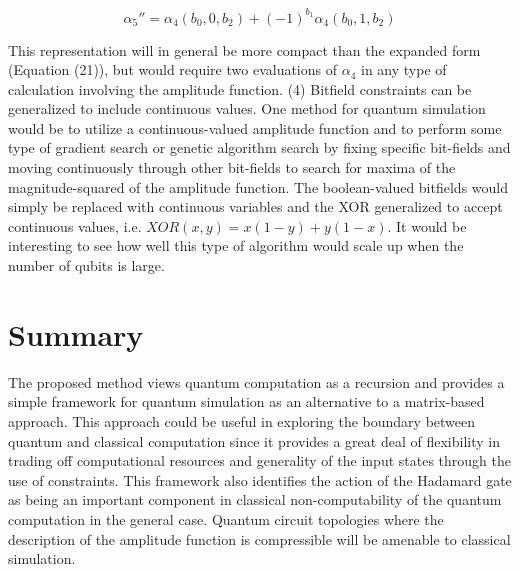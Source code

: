 \documentclass[reqno]{amsart}
\theoremstyle{definition}
\theoremstyle{remark}
\begin{document}
\begin{equation}
\alpha_5''  = \alpha_4 (b_0,0,b_2) + (-1)^{b_1}\alpha_4 (b_0,1,b_2)
\end{equation}

\noindent
This representation will in general be more compact than the expanded form (Equation (21)), but would require two evaluations of $\alpha_4$ in any type of calculation involving the amplitude function. \newline
\newline
\noindent
(4) Bitfield constraints can be generalized to include continuous values. One method for quantum simulation would be to utilize a continuous-valued amplitude function and to perform some type of gradient search or genetic algorithm search by fixing specific bit-fields and moving continuously through other bit-fields to search for maxima of the magnitude-squared of the amplitude function. The boolean-valued bitfields would simply be replaced with continuous variables and the XOR generalized to accept continuous values, i.e. $XOR(x,y)=x(1-y)+y(1-x)$. It would be interesting to see how well this type of algorithm would scale up when the number of qubits is large.


\section{Summary}
\noindent
The proposed method views quantum computation as a recursion and provides a simple framework for quantum simulation as an alternative to a matrix-based approach. This approach could be useful in exploring the boundary between quantum and classical computation since it provides a great deal of flexibility in trading off computational resources and generality of the input states through the use of constraints. This framework also identifies the action of the Hadamard gate as being an important component in classical non-computability of the quantum computation in the general case. Quantum circuit topologies where the description of the amplitude function is compressible will be amenable to classical simulation.




\end{document}
